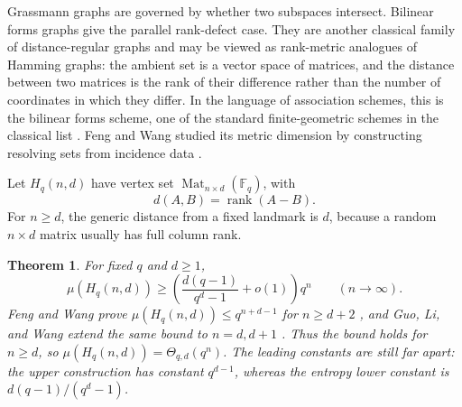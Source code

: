 \documentclass[11pt]{article}
\newtheorem{theorem}{Theorem}[section]
\theoremstyle{definition}
\theoremstyle{remark}
\newcommand{\F}{\mathbb F}
\newcommand{\Mat}{\operatorname{Mat}}
\newcommand{\rank}{\operatorname{rank}}
\begin{document}
Grassmann graphs are governed by whether two subspaces intersect.  Bilinear
forms graphs give the parallel rank-defect case.  They are another classical
family of distance-regular graphs and may be viewed as rank-metric analogues of Hamming graphs:
the ambient set is a vector space of matrices, and the distance between 
two matrices is the rank of their difference rather than the number of 
coordinates in which they differ.  In the language of association schemes, 
this is the bilinear forms scheme, one of the standard finite-geometric 
schemes in the classical list \cite[Ch.~9]{BCN}.  Feng and Wang studied 
its metric dimension by constructing resolving sets from incidence data 
\cite{FengWang}.

Let \(H_q(n,d)\) have vertex set \(\Mat_{n\times d}(\F_q)\), with
\[
        d(A,B)=\rank(A-B).
\]
For \(n\geq d\), the generic distance from a fixed landmark is \(d\), 
because a random \(n\times d\) matrix usually has full column rank. 

\begin{theorem}\label{thm:bilinear}
For fixed \(q\) and \(d\geq1\),
\[
        \mu(H_q(n,d))
        \geq
        \left(\frac{d(q-1)}{q^d-1}+o(1)\right)q^n
        \qquad (n\to\infty).
\]
Feng and Wang prove \(\mu(H_q(n,d))\le q^{n+d-1}\) for \(n\ge d+2\)
\cite[Theorem~1.1]{FengWang}, and Guo, Li, and Wang extend the same bound to
\(n=d,d+1\) \cite{GuoLiWangFour}.  Thus the bound holds for \(n\geq d\), so
\(\mu(H_q(n,d))=\Theta_{q,d}(q^n)\).  The leading constants are still far
apart: the upper construction has constant \(q^{d-1}\), whereas the 
entropy lower constant is \(d(q-1)/(q^d-1)\).
\end{theorem}
\end{document}
